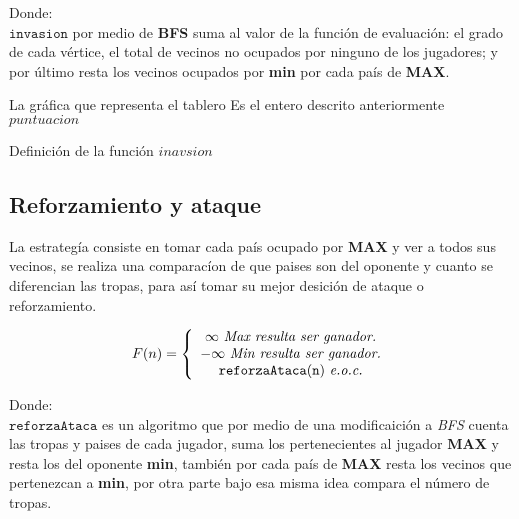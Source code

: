 \documentclass[12pt,twocolumn,draft]{article}
\begin{document}
Donde:\\

$\mathtt{invasion}$ por medio de \textbf{BFS} suma al valor de la funci\'on de evaluaci\'on: el
grado de cada v\'ertice, el total de vecinos no ocupados por ninguno de los jugadores; y por \'ultimo
resta los vecinos ocupados por \textbf{min} por cada pa\'is de \textbf{MAX}.\\

\begin{algorithm}
\begin{algorithmic}[1]
\REQUIRE La gr\'afica que representa el tablero
\ENSURE Es el entero descrito anteriormente
\ENDFOR
{}
\ENDIF
{}
\ENDIF
{}
\ENDIF
\ENDFOR
\ENDWHILE
\RETURN $puntuacion$
\end{algorithmic}
\caption{Definici\'on de la funci\'on $inavsion$}
\label{invasion}
\end{algorithm}

\subsection{Reforzamiento y ataque}

La estrateg\'ia consiste en tomar cada pa\'is ocupado por \textbf{MAX} y ver a todos sus vecinos,
se realiza una comparac\'ion de que paises son del oponente y cuanto se diferencian las tropas, para así tomar su
mejor desici\'on de ataque o reforzamiento.

$$ 
F(n)= \left\{\begin{array}{c l}
  \infty\ \textit{Max\ resulta\ ser\ ganador.}\\
  -\infty\ \textit{Min\ resulta\ ser\ ganador.}\\
  \mathtt{reforzaAtaca(n)}\ \textit{e.o.c.}
\end{array}
\right.
$$

Donde:\\

$\mathtt{reforzaAtaca}$ es un algoritmo que por medio de una modificaici\'on a \textit{BFS} cuenta
las tropas y paises de cada jugador, suma los pertenecientes al jugador \textbf{MAX} y resta los del oponente 
\textbf{min}, tambi\'en por cada pa\'is de \textbf{MAX} resta los vecinos que pertenezcan a \textbf{min}, por otra
parte bajo esa misma idea compara el n\'umero de tropas.\\
\end{document}

